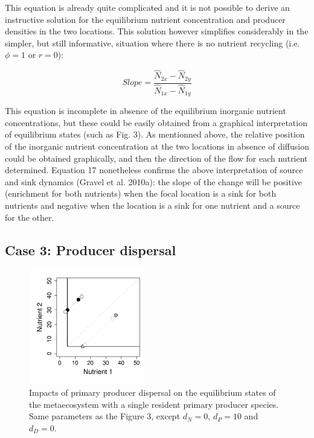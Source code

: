 \documentclass[letterpaper,twocolumn,showkeys]{revtex4-1}
\begin{document}
	This equation is already quite complicated and it is not possible to derive an instructive solution for the equilibrium nutrient concentration and producer densities in the two locations. This solution however simplifies considerably in the simpler, but still informative, situation where there is no nutrient recycling (i.e. $\phi = 1$ or $r = 0$):

\begin{equation}
	\label{e:bnet}
	Slope=\frac{\widehat{N}_{2x}-\widehat{N}_{2y}}{\widehat{N}_{1x}-\widehat{N}_{1y}}
\end{equation}

This equation is incomplete in absence of the equilibrium inorganic nutrient concentrations, but these could be easily obtained from a graphical interpretation of equilibrium states (such as Fig. 3). As mentionned above, the relative position of the inorganic nutrient concentration at the two locations in absence of diffusion could be obtained graphically, and then the direction of the flow for each nutrient determined. Equation 17 nonetheless confirms the above interpretation of source and sink dynamics (Gravel et al. 2010a): the slope of the change will be positive (enrichment for both nutrients) when the focal location is a sink for both nutrients and negative when the location is a sink for one nutrient and a source for the other.

\subsection{Case 3: Producer dispersal}

\begin{figure}[tb]
   \centering
   \includegraphics[width=0.45\textwidth]{ProducerDiffusion.pdf}
   \caption{Impacts of primary producer dispersal on the equilibrium states of the metaecosystem with a single resident primary producer species. Same parameters as the Figure 3, except $d_N = 0$, $d_P = 10$ and $d_D = 0$.}
   \label{f:Producers}
\end{figure}
\end{document}

